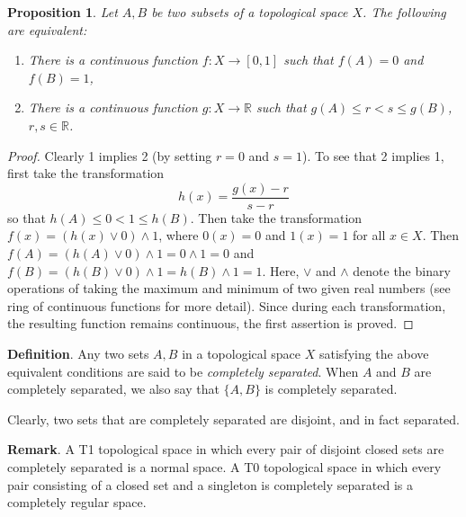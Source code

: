 \documentclass[12pt]{article}
\newtheorem{prop}{Proposition}
\begin{document}
\begin{prop} Let $A,B$ be two subsets of a topological space $X$.  The following are equivalent:
\begin{enumerate}
\item There is a continuous function $f:X\to [0,1]$ such that $f(A)=0$ and $f(B)=1$,
\item There is a continuous function $g:X\to \mathbb{R}$ such that $g(A)\le r<s \le g(B)$, $r,s\in \mathbb{R}$.
\end{enumerate}
\end{prop}
\begin{proof}
Clearly 1 implies 2 (by setting $r=0$ and $s=1$).  To see that 2 implies 1, first take the transformation $$h(x)=\frac{g(x)-r}{s-r}$$ so that $h(A)\le 0< 1\le h(B)$.  Then take the transformation $f(x)=(h(x)\vee 0)\wedge 1$, where $0(x)=0$ and $1(x)=1$ for all $x\in X$.  Then $f(A)=(h(A)\vee 0)\wedge 1=0\wedge 1=0$ and $f(B)=(h(B)\vee 0)\wedge 1=h(B)\wedge 1=1$.  Here, $\vee$ and $\wedge$ denote the binary operations of taking the maximum and minimum of two given real numbers (see ring of continuous functions for more detail).  Since during each transformation, the resulting function remains continuous, the first assertion is proved.
\end{proof}

\textbf{Definition}.  Any two sets $A,B$ in a topological space $X$ satisfying the above equivalent conditions are said to be \emph{completely separated}.  When $A$ and $B$ are completely separated, we also say that $\lbrace A,B\rbrace$ is completely separated.

Clearly, two sets that are completely separated are disjoint, and in fact separated.

\textbf{Remark}.  A T1 topological space in which every pair of disjoint closed sets are completely separated is a normal space.  A T0 topological space in which every pair consisting of a closed set and a singleton is completely separated is a completely regular space.
\end{document}
